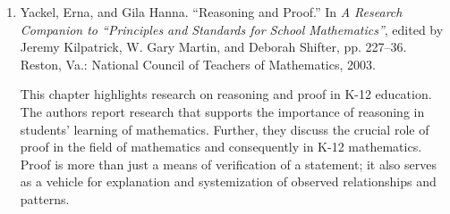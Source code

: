 \documentclass[
  10pt,
  a4paper,
  landscape,
  twoside,
  openany
]{scrbook}
\begin{document}
{{\begin{enumerate}
    \item Yackel, Erna, and Gila Hanna. ``Reasoning and Proof.'' In \emph{A Research Companion to ``Principles and Standards for School Mathematics''}, edited by Jeremy Kilpatrick, W. Gary Martin, and Deborah Shifter, pp. 227--36. Reston, Va.: National Council of Teachers of Mathematics, 2003.
    
      This chapter highlights research on reasoning and proof in K-12 education. The authors report research that supports the importance of reasoning in students' learning of mathematics. Further, they discuss the crucial role of proof in the field of mathematics and consequently in K-12 mathematics. Proof is more than just a means of verification of a statement; it also serves as a vehicle for explanation and systemization of observed relationships and patterns.
  \end{enumerate}}
}
\end{document}
